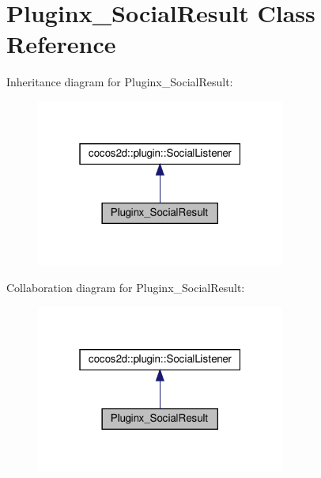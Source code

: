\hypertarget{classPluginx__SocialResult}{}\section{Pluginx\+\_\+\+Social\+Result Class Reference}
\label{classPluginx__SocialResult}


Inheritance diagram for Pluginx\+\_\+\+Social\+Result\+:
\nopagebreak
\begin{figure}[H]
\begin{center}
\leavevmode
\includegraphics[width=232pt]{classPluginx__SocialResult__inherit__graph}
\end{center}
\end{figure}


Collaboration diagram for Pluginx\+\_\+\+Social\+Result\+:
\nopagebreak
\begin{figure}[H]
\begin{center}
\leavevmode
\includegraphics[width=232pt]{classPluginx__SocialResult__coll__graph}
\end{center}
\end{figure}
